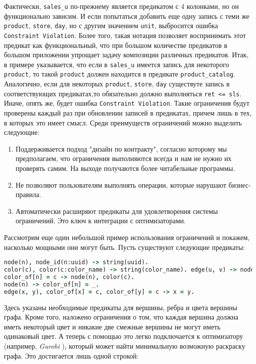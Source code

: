 Фактически, \lstinline{sales_u} по-прежнему является предикатом с 4 колонками, но он функционально зависим. И если попытаться добавить еще одну запись с теми же \lstinline{product}, \lstinline{store}, \lstinline{day}, но с другим значением \lstinline{unit}, выбросится ошибка \lstinline{Constraint Violation}. Более того, такая нотация позволяет воспринимать этот предикат как функциональный, что при большом количестве предикатов в большом приложении упрощает задачу композиции различных предикатов. Итак, в примере указывается, что если в \lstinline{sales_u} имеется запись для некоторого \lstinline{product}, то такой \lstinline{product} должен находится в предикате \lstinline{product_catalog}. Аналогично, если для некоторых \lstinline{product}, \lstinline{store}, \lstinline{day} существуте запись в соответствующих предикатах,то обязательно должно выполняться \lstinline{ret <= sls}. Иначе, опять же, будет ошибка \lstinline{Constraint Violation}. Такие ограничения будут проверены каждый раз при обновлении записей в предикатах, причем лишь в тех, в которых это имеет смысл.
Среди преимуществ ограничений можно выделить следующие:
\begin{enumerate}
  \item Поддерживается подход "дизайн по контракту", согласно которому мы предполагаем, что ограничения выполняются всегда и нам не нужно их проверять самим. На выходе получаются более читабельные программы.
  \item Не позволяют пользователям выполнять операции, которые нарушают бизнес-правила.
  \item Автоматически расширяют предикаты для удовлетворения системы ограничений. Это ключ к интеграции с оптимизаторами.
\end{enumerate}

Рассмотрим еще один небольшой пример использования ограничений и покажем, насколько мощными они могут быть. Пусть существуют следующие предикаты:

\begin{lstlisting}[language=Prolog]
node(n), node_id(n:uuid) -> string(uuid).
color(c), color(c:color_name) -> string(color_name). edge(u, v) -> node(u), node(v).
color_of[n] = c -> node(n), color(c).
node(n) -> color_of[n] = _.
edge(x, y), color_of[x] = c, color_of[y] = c -> x = y.
\end{lstlisting}

Здесь указаны необходимые предикаты для вершины, ребра и цвета вершины графа. Кроме того, наложено ограничения о том, что каждая вершина должна иметь некоторый цвет и никакие две смежные вершины не могут иметь одинаковый цвет. А теперь с помощью \LB это легко подключается к оптимизатору (например, \emph{Gurobi} \cite{gurobi_manual}), который может найти минимальную возможную раскраску графа. Это достигается лишь одной строкой:

